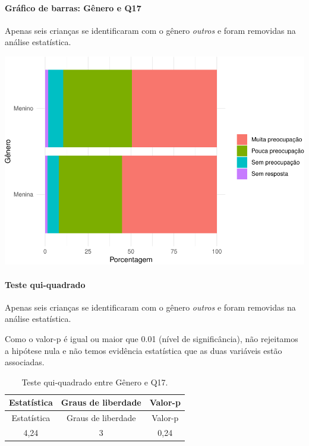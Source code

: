 \documentclass[]{article}
\let\oldparagraph\paragraph
\renewcommand{\paragraph}[1]{\oldparagraph{#1}\mbox{}}
\begin{document}
\hypertarget{gruxe1fico-de-barras-guxeanero-e-q17}{%
\paragraph{Gráfico de barras: Gênero e Q17}\label{gruxe1fico-de-barras-guxeanero-e-q17}}

Apenas seis crianças se identificaram com o gênero \emph{outros} e foram removidas na análise estatística.

\begin{center}\includegraphics[width=0.75\linewidth]{relatorio_covid19_files/figure-latex/unnamed-chunk-200-1} \end{center}

\hypertarget{teste-qui-quadrado-18}{%
\paragraph{Teste qui-quadrado}\label{teste-qui-quadrado-18}}

Apenas seis crianças se identificaram com o gênero \emph{outros} e foram removidas na análise estatística.

Como o valor-p é igual ou maior que 0.01 (nível de significância), não rejeitamos a hipótese nula e não temos evidência estatística que as duas variáveis estão associadas.

\begin{longtable}[]{@{}ccc@{}}
\caption{\label{tab:unnamed-chunk-202}Teste qui-quadrado entre Gênero e Q17.}\tabularnewline
\toprule
Estatística & Graus de liberdade & Valor-p\tabularnewline
\midrule
\endfirsthead
\toprule
Estatística & Graus de liberdade & Valor-p\tabularnewline
\midrule
\endhead
4,24 & 3 & 0,24\tabularnewline
\bottomrule
\end{longtable}

\cleardoublepage
\end{document}
